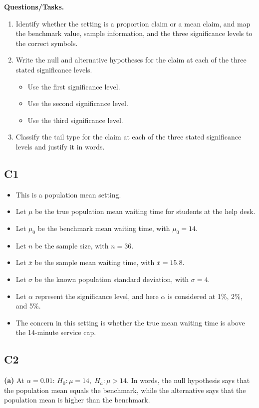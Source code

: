 \begin{ExamProblems}
		\textbf{Questions/Tasks.}
		\begin{enumerate}
			\item[(C1)] Identify whether the setting is a proportion claim or a mean claim, and map the benchmark value, sample information, and the three significance levels to the correct symbols.
			\item[(C2)] Write the null and alternative hypotheses for the claim at each of the three stated significance levels.
			\begin{itemize}
				\item[(a)] Use the first significance level.
				\item[(b)] Use the second significance level.
				\item[(c)] Use the third significance level.
			\end{itemize}
			\item[(C3)] Classify the tail type for the claim at each of the three stated significance levels and justify it in words.
		\end{enumerate}
		
		\subsection*{C1}
		\begin{itemize}
			\item This is a population mean setting.
			\item Let \(\mu\) be the true population mean waiting time for students at the help desk.
			\item Let \(\mu_0\) be the benchmark mean waiting time, with \(\mu_0=14\).
			\item Let \(n\) be the sample size, with \(n=36\).
			\item Let \(\bar{x}\) be the sample mean waiting time, with \(\bar{x}=15.8\).
			\item Let \(\sigma\) be the known population standard deviation, with \(\sigma=4\).
			\item Let \(\alpha\) represent the significance level, and here \(\alpha\) is considered at 1\%, 2\%, and 5\%.
			\item The concern in this setting is whether the true mean waiting time is above the 14-minute service cap.
		\end{itemize}
		
		\subsection*{C2}
		\textbf{(a)} At \(\alpha=0.01\): \(H_0\colon \mu=14,\; H_a\colon \mu>14\). In words, the null hypothesis says that the population mean equals the benchmark, while the alternative says that the population mean is higher than the benchmark.
		

\end{ExamProblems}
